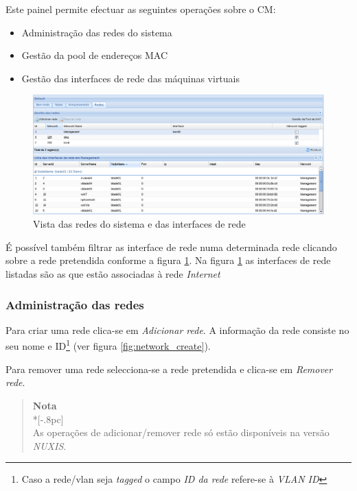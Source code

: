 Este painel permite efectuar as seguintes operações sobre o CM:

\begin{itemize}
	\item Administração das redes do sistema
	\item Gestão da pool de endereços MAC
	\item Gestão das interfaces de rede das máquinas virtuais 
\end{itemize}

\begin{figure}[H]
	\begin{center}
	\includegraphics[scale=0.45]{screenshots/main_networks.png}
	\caption{Vista das redes do sistema  e das interfaces de rede}
	\label{fig:main_networks}
	\end{center}
\end{figure}

É possível também filtrar as interface de rede numa determinada rede clicando sobre a rede pretendida conforme a figura \ref{fig:main_networks}.
Na figura \ref{fig:main_networks} as interfaces de rede listadas são as que estão associadas à rede \emph{Internet}

\subsubsection{Administração das redes}

Para criar uma rede clica-se em \emph{Adicionar rede}.
A informação da rede consiste no seu nome e ID\footnote{Caso a rede/vlan seja \emph{tagged} o campo \emph{ID da rede} refere-se à \emph{VLAN ID}} (ver figura \ref{fig:network_create}).

Para remover uma rede selecciona-se a rede pretendida e clica-se em \emph{Remover rede}.

\begin{quote}
	{\large \bf Nota} \\*[-.8pc]
	\underline{\hspace{6in}} \\
	As operações de adicionar/remover rede só estão disponíveis na versão \emph{NUXIS}.
\end{quote}


